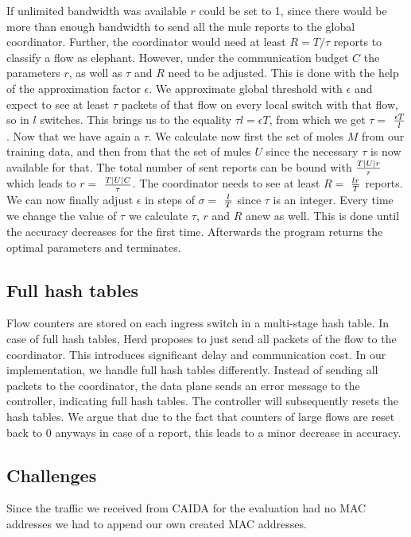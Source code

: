 \documentclass[11pt,oneside,a4paper]{article}
\begin{document}
If unlimited bandwidth was available $r$ could be set to 1, since there would be more than enough bandwidth to send all the mule reports to the global coordinator. Further, the coordinator would need at least $R = T/\tau$ reports to classify a flow as elephant. However, under the communication budget $C$ the parameters $r$, as well as $\tau$ and $R$ need to be adjusted. This is done with the help of the approximation factor $\epsilon$. We approximate global threshold with $\epsilon$ and expect to see at least $\tau$ packets of that flow on every local switch with that flow, so in $l$ switches. This brings us to the equality $\tau l = \epsilon T$, from which we get $\tau =$ $\epsilon T\over l$. Now that we have again a $\tau$. We calculate now first the set of moles $M$ from our training data, and then from that the set of mules $U$ since the necessary $\tau$ is now available for that. The total number of sent reports can be bound with $T|U|r\over \tau$ which leads to $r =$ $T|U|C\over \tau$. The coordinator needs to see at least $R =$ $lr\over T$ reports. We can now finally adjust $\epsilon$ in steps of $\sigma =$ $l\over T$ since $\tau$ is an integer. Every time we change the value of $\tau$ we calculate $\tau$, $r$ and $R$ anew as well. This is done until the accuracy decreases for the first time. Afterwards the program returns the optimal parameters and terminates.

\subsection{Full hash tables} \label{special}%

Flow counters are stored on each ingress switch in a multi-stage hash table. In case of full hash tables, Herd proposes to just send all packets of the flow to the coordinator. This introduces significant delay and communication cost. In our implementation, we handle full hash tables differently. Instead of sending all packets to the coordinator, the data plane sends an error message to the controller, indicating full hash tables. The controller will subsequently resets the hash tables. We argue that due to the fact that counters of large flows are reset back to 0 anyways in case of a report, this leads to a minor decrease in accuracy.

\subsection{Challenges} \label{challenges}
Since the traffic we received from CAIDA for the evaluation had no MAC addresses we had to append our own created MAC addresses.
\end{document}
